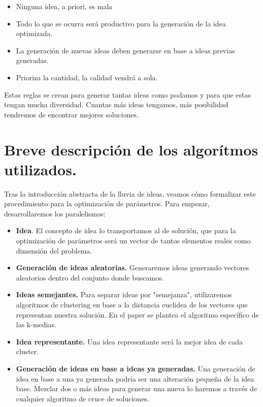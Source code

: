 \begin{itemize}
	\item Ninguna idea, a priori, es mala
	\item Todo lo que se ocurra será productivo para la generación de la idea optimizada.
	\item La generación de nuevas ideas deben generarse en base a ideas previas generadas.
	\item Prioriza la cantidad, la calidad vendrá a sola.
\end{itemize}

Estas reglas se crean para generar tantas ideas como podamos y para que estas tengan mucha diversidad. Cuantas más ideas tengamos, más posibilidad tendremos de encontrar mejores soluciones.\\

\newpage

\section{Breve descripción de los algorítmos utilizados.}

Tras la introducción abstracta de la lluvia de ideas, veamos cómo formalizar este procedimiento para la optimización de parámetros. Para empezar, desarrollaremos los paralelismos:\\

\begin{itemize}
	\item \textbf{Idea}. El concepto de idea lo transportamos al de solución, que para la optimización de parámetros será un vector de tantos elementos reales como dimensión del problema.
	
	\item \textbf{Generación de ideas aleatorias.} Generaremos ideas generando vectores aleatorios dentro del conjunto donde buscamos.
	
	\item \textbf{Ideas semejantes.} Para separar ideas por "semejanza", utilizaremos algoritmos de clustering en base a la distancia euclidea de los vectores que representan nuestra solución. En el paper se plantea el algoritmo específico de las k-medias.
	
	\item \textbf{Idea representante.} Una idea representante será la mejor idea de cada cluster.
	
	\item \textbf{Generación de ideas en base a ideas ya generadas.} Una generación de idea en base a una ya generada podría ser una alteración pequeña de la idea base. Mezclar dos o más ideas para generar una nueva lo haremos a través de cualquier algoritmo de cruce de soluciones.
	
\end{itemize}

